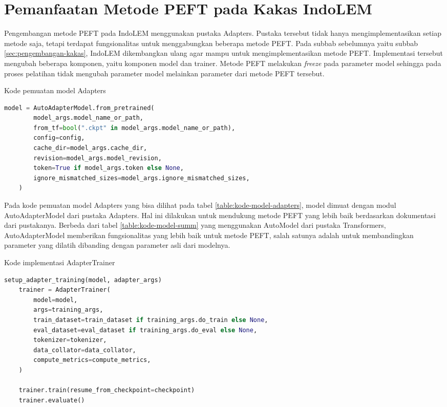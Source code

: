 \section{Pemanfaatan Metode PEFT pada Kakas IndoLEM}

Pengembangan metode PEFT pada IndoLEM menggunakan pustaka Adapters. Pustaka tersebut tidak hanya mengimplementasikan setiap metode saja, tetapi terdapat fungsionalitas untuk menggabungkan beberapa metode PEFT. Pada subbab sebelumnya yaitu subbab \ref{sec:pengembangan-kakas}, IndoLEM dikembangkan ulang agar mampu untuk mengimplementasikan metode PEFT. Implementasi tersebut  mengubah beberapa komponen, yaitu komponen model dan trainer. Metode PEFT  melakukan \textit{freeze} pada parameter model sehingga pada proses pelatihan tidak  mengubah parameter model melainkan parameter dari metode PEFT tersebut.

\begin{table}[h]
    \caption{Kode pemuatan model Adapters}
    \label{table:kode-model-adapters}
    \begin{lstlisting}[language=python]
    model = AutoAdapterModel.from_pretrained(
        model_args.model_name_or_path,
        from_tf=bool(".ckpt" in model_args.model_name_or_path),
        config=config,
        cache_dir=model_args.cache_dir,
        revision=model_args.model_revision,
        token=True if model_args.token else None,
        ignore_mismatched_sizes=model_args.ignore_mismatched_sizes,
    )
    \end{lstlisting}
\end{table}

Pada kode pemuatan model Adapters yang bisa dilihat pada tabel \ref{table:kode-model-adapters}, model dimuat dengan modul AutoAdapterModel dari pustaka Adapters. Hal ini dilakukan untuk mendukung metode PEFT yang lebih baik berdasarkan dokumentasi dari pustakanya. Berbeda dari tabel \ref{table:kode-model-summ} yang menggunakan AutoModel dari pustaka Transformers, AutoAdapterModel memberikan fungsionalitas yang lebih baik untuk metode PEFT, salah satunya adalah untuk membandingkan parameter yang  dilatih dibanding dengan parameter asli dari modelnya.

\begin{table}[h]
    \caption{Kode implementasi AdapterTrainer}
    \label{table:kode-adaptertrainer}
    \begin{lstlisting}[language=python]
    setup_adapter_training(model, adapter_args)
    trainer = AdapterTrainer(
        model=model,
        args=training_args,
        train_dataset=train_dataset if training_args.do_train else None,
        eval_dataset=eval_dataset if training_args.do_eval else None,
        tokenizer=tokenizer,
        data_collator=data_collator,
        compute_metrics=compute_metrics,
    )

    trainer.train(resume_from_checkpoint=checkpoint)
    trainer.evaluate()
    \end{lstlisting}
\end{table}

